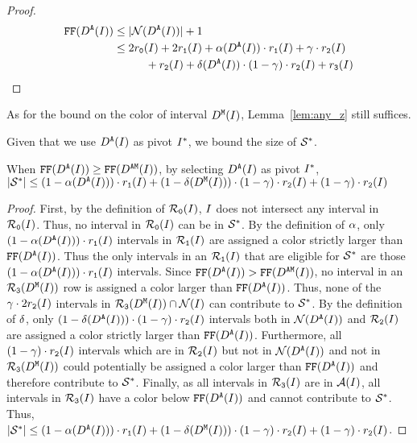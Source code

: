 {\begin{proof}
    \begin{align*}
            \text{\texttt{FF}}(D^\texttt{A}(I)) &\leq |\mathcal{N}(D^\texttt{A}(I))| + 1\\
            &\leq 2r_\texttt{0}(I) + 2r_\texttt{1}(I) + \alpha(D^\texttt{A}(I)) \cdot r_\texttt{1}(I) + \gamma  \cdot r_\texttt{2}(I) \\&\hspace{1cm} + r_\texttt{2}(I) + \delta(D^\texttt{A}(I)) \cdot (1 - \gamma ) \cdot r_\texttt{2}(I) + r_\texttt{3}(I)
        \end{align*}    
\end{proof}

As for the bound on the color of interval $D^\texttt{M}(I)$, Lemma~\ref{lem:any_z} still suffices.

\medskip


Given that we use $D^\texttt{A}(I)$ as pivot $I^*$, we bound the size of $\mathcal{S}^*$.

\begin{lemma}
    \label{lem:pivotset_y_exact}
    When $\text{\texttt{FF}}(D^\texttt{A}(I)) \geq \text{\texttt{FF}}(D^\texttt{AM}(I))$, by selecting $D^\texttt{A}(I)$ as pivot $I^*$, $|\mathcal{S}^*| \leq (1 - \alpha(D^\texttt{A}(I))) \cdot r_\texttt{1}(I) + (1 - \delta(D^\texttt{M}(I))) \cdot (1 - \gamma ) \cdot r_\texttt{2}(I) + (1 - \gamma ) \cdot r_\texttt{2}(I)$
\end{lemma}

\begin{proof}
    First, by the definition of $\mathcal{R}_\texttt{0}(I)$, $I$ does not intersect any interval in $\mathcal{R}_\texttt{0}(I)$.
    Thus, no interval in $\mathcal{R}_\texttt{0}(I)$ can be in $\mathcal{S}^*$.
    By the definition of $\alpha$, only $(1 - \alpha(D^\texttt{A}(I)) ) \cdot r_\texttt{1}(I)$ intervals in $\mathcal{R}_\texttt{1}(I)$ are assigned a color strictly larger than $\text{\texttt{FF}}(D^\texttt{A}(I))$.
    Thus the only intervals in an $\mathcal{R}_\texttt{1}(I)$ that are eligible for $\mathcal{S}^*$ are those $(1 - \alpha(D^\texttt{A}(I)) ) \cdot r_\texttt{1}(I)$ intervals.
    Since $\text{\texttt{FF}}(D^\texttt{A}(I)) > \text{\texttt{FF}}(D^\texttt{AM}(I))$, no interval in an $\mathcal{R}_\texttt{3}(D^\texttt{M}(I))$ row is assigned a color larger than $\text{\texttt{FF}}(D^\texttt{A}(I))$.
    Thus, none of the $\gamma \cdot 2r_\texttt{2}(I)$ intervals in $\mathcal{R}_\texttt{3}(D^\texttt{M}(I)) \cap \mathcal{N}(I)$ can contribute to $\mathcal{S}^*$.
    By the definition of $\delta$, only $(1 - \delta(D^\texttt{A}(I)) ) \cdot (1 - \gamma) \cdot r_\texttt{2}(I)$ intervals both in $\mathcal{N}(D^\texttt{A}(I))$ and $\mathcal{R}_\texttt{2}(I)$ are assigned a color strictly larger than $\text{\texttt{FF}}(D^\texttt{A}(I))$.
    Furthermore, all $(1 - \gamma) \cdot r_\texttt{2}(I)$ intervals which are in $\mathcal{R}_\texttt{2}(I)$ but not in $\mathcal{N}(D^\texttt{A}(I))$ and not in $\mathcal{R}_\texttt{3}(D^\texttt{M}(I))$ could potentially be assigned a color larger than $\text{\texttt{FF}}(D^\texttt{A}(I))$ and therefore contribute to $\mathcal{S}^*$.
    Finally, as all intervals in $\mathcal{R}_\texttt{3}(I)$ are in $\mathcal{A}(I)$, all intervals in $\mathcal{R}_\texttt{3}(I)$ have a color below $\text{\texttt{FF}}(D^\texttt{A}(I))$ and cannot contribute to $\mathcal{S}^*$.
    Thus, $|\mathcal{S}^*| \leq (1 - \alpha(D^\texttt{A}(I))) \cdot r_\texttt{1}(I) + (1 - \delta(D^\texttt{M}(I))) \cdot (1 - \gamma ) \cdot r_\texttt{2}(I) + (1 - \gamma ) \cdot r_\texttt{2}(I)$.
\end{proof}

}
